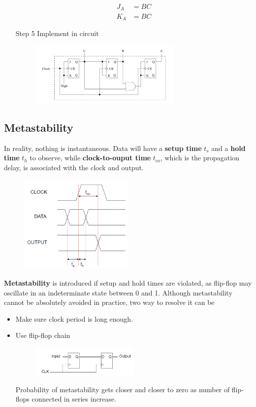 \documentclass[12pt]{article}
\theoremstyle{definition}
\begin{document}
\begin{itemize}
  \begin{align*}
  J_A&=BC\\
  K_A&=BC
  \end{align*}
  \item[Step 5] Implement in circuit
  \begin{figure}[h]
  \centering
  \includegraphics[width = 0.7\textwidth]{8_11.png}
  \end{figure}
\end{itemize}
\subsection{Metastability}
In reality, nothing is instantaneous. Data will have a \textbf{setup time} $t_s$ and a \textbf{hold time} $t_h$ to observe, while \textbf{clock-to-ouput time} $t_\text{co}$, which is the propagation delay, is associated with the clock and output.\clearpage
\begin{figure}[h]
\centering
\includegraphics[width = 0.5\textwidth]{8_12.png}
\end{figure}
\textbf{Metastability} is introduced if setup and hold times are violated, as flip-flop may oscillate in an indeterminate state between 0 and 1.
Although metastability cannot be absolutely avoided in practice, two way to resolve it can be
\begin{itemize}
  \item Make sure clock period is long enough.
  \item Use flip-flop chain
  \begin{figure}[h]
  \centering
  \includegraphics[width = 0.5\textwidth]{8_13.png}
  \end{figure}
  Probability of metastability gets closer and closer to zero as number of flip-flops connected in series increase.
\end{itemize}
\end{document}
